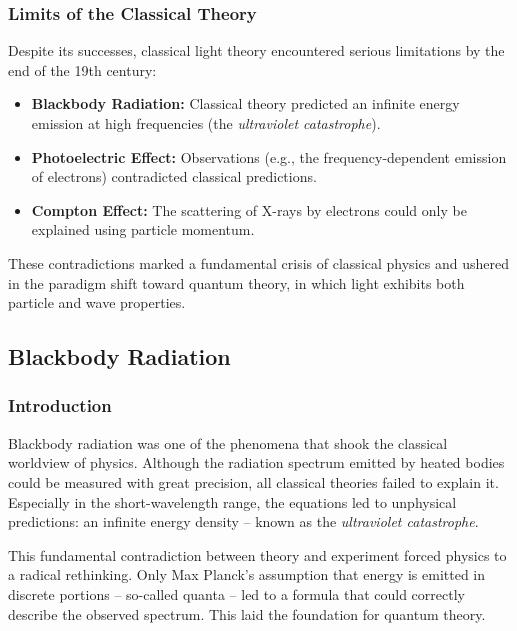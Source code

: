 \subsubsection{Limits of the Classical Theory}
Despite its successes, classical light theory encountered serious limitations by the end of the 19th century:

\begin{itemize}
	\item \textbf{Blackbody Radiation:} Classical theory predicted an infinite energy emission at high frequencies (the \emph{ultraviolet catastrophe}).
	\item \textbf{Photoelectric Effect:} Observations (e.g., the frequency-dependent emission of electrons) contradicted classical predictions.
	\item \textbf{Compton Effect:} The scattering of X-rays by electrons could only be explained using particle momentum.
\end{itemize}

These contradictions marked a fundamental crisis of classical physics and ushered in the paradigm shift toward quantum theory, in which light exhibits both particle and wave properties.
\subsection{Blackbody Radiation}

\subsubsection{Introduction}
Blackbody radiation was one of the phenomena that shook the classical worldview of physics. Although the radiation spectrum emitted by heated bodies could be measured with great precision, all classical theories failed to explain it. Especially in the short-wavelength range, the equations led to unphysical predictions: an infinite energy density – known as the \emph{ultraviolet catastrophe}.

This fundamental contradiction between theory and experiment forced physics to a radical rethinking. Only Max Planck’s assumption that energy is emitted in discrete portions – so-called quanta – led to a formula that could correctly describe the observed spectrum. This laid the foundation for quantum theory.

